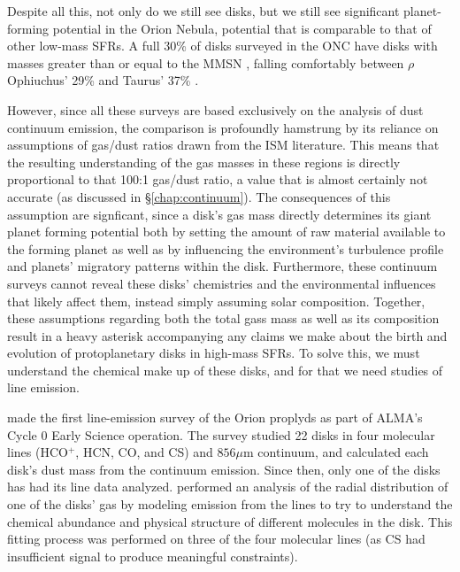   
Despite all this, not only do we still see disks, but we still see significant planet-forming potential in the Orion Nebula, potential that is comparable to that of other low-mass SFRs. A full 30\% of disks surveyed in the ONC have disks with masses greater than or equal to the MMSN \citep{Mann2014}, falling comfortably between $\rho$ Ophiuchus' 29\% \cite{AndrewsWilliams2005} and Taurus' 37\% \citep{AndrewsWilliams2007}.


However, since all these surveys are based exclusively on the analysis of dust continuum emission, the comparison is profoundly hamstrung by its reliance on assumptions of gas/dust ratios drawn from the ISM literature. This means that the resulting understanding of the gas masses in these regions is directly proportional to that 100:1 gas/dust ratio, a value that is almost certainly not accurate (as discussed in \S\ref{chap:continuum}). The consequences of this assumption are signficant, since a disk's gas mass directly determines its giant planet forming potential both by setting the amount of raw material available to the forming planet as well as by influencing the environment's turbulence profile and planets' migratory patterns within the disk. Furthermore, these continuum surveys cannot reveal these disks' chemistries and the environmental influences that likely affect them, instead simply assuming solar composition. Together, these assumptions regarding both the total gass mass as well as its composition result in a heavy asterisk accompanying any claims we make about the birth and evolution of protoplanetary disks in high-mass SFRs. To solve this, we must understand the chemical make up of these disks, and for that we need studies of line emission.




\citet{Mann2014} made the first line-emission survey of the Orion proplyds as part of ALMA's Cycle 0 Early Science operation. The survey studied 22 disks in four molecular lines (HCO$^+$, HCN, CO, and CS) and $856 \mu$m continuum, and calculated each disk's dust mass from the continuum emission. Since then, only one of the disks has had its line data analyzed. \cite{Factor2017} performed an analysis of the radial distribution of one of the disks' gas by modeling emission from the lines to try to understand the chemical abundance and physical structure of different molecules in the disk. This fitting process was performed on three of the four molecular lines (as CS had insufficient signal to produce meaningful constraints).

